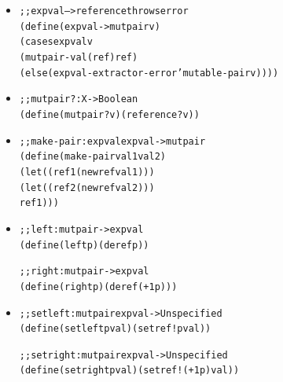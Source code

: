 \documentclass{beamer}
\begin{document}
\begin{frame}[fragile]
\begin{scriptsize}
\begin{itemize}
\item<1->
\begin{alltt}
;; expval --> reference throws error
(define (expval->mutpair v)
  (cases expval v
    (mutpair-val (ref) ref)
    (else (expval-extractor-error 'mutable-pair v))))
\end{alltt}

\item<2->
\begin{alltt}
;; mutpair? : X -> Boolean
(define (mutpair? v) (reference? v))
\end{alltt}

\item<3->
\begin{alltt}
;; make-pair : expval expval -> mutpair
(define (make-pair val1 val2)
  (let ((ref1 (newref val1)))
    (let ((ref2 (newref val2)))
      ref1)))
\end{alltt}

\item<4->
\begin{alltt}
;; left : mutpair -> expval
(define (left p) (deref p))

;; right : mutpair -> expval
(define (right p) (deref (+ 1 p)))
\end{alltt}

\item<5->
\begin{alltt}
;; setleft : mutpair expval -> Unspecified
(define (setleft p val) (setref! p val))

;; setright : mutpair expval -> Unspecified
(define (setright p val) (setref! (+ 1 p) val))
\end{alltt}

\end{itemize}
\end{scriptsize}
\end{frame}
\end{document}

